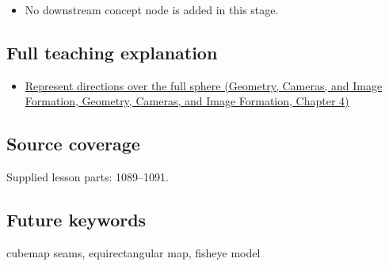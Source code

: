 \begin{itemize}
\tightlist
\item
  No downstream concept node is added in this stage.
\end{itemize}

\subsection{Full teaching explanation}\label{appendix-fc99ad39f351-full-teaching-explanation}

\begin{itemize}
\tightlist
\item
  \href{../03-Geometry-Cameras-and-Image-Formation/main.pdf\#nameddest=02-foundations-ii-ch035-represent-directions-over-the-full-sphere}{Represent directions over the full sphere (Geometry, Cameras, and Image Formation, Geometry, Cameras, and Image Formation, Chapter 4)}
\end{itemize}

\subsection{Source coverage}\label{appendix-fc99ad39f351-source-coverage}

Supplied lesson parts: 1089--1091.

\subsection{Future keywords}\label{appendix-fc99ad39f351-future-keywords}

cubemap seams, equirectangular map, fisheye model
